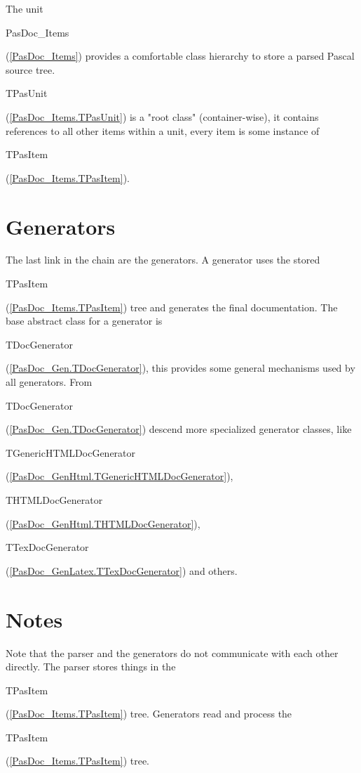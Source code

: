 \documentclass{report}
\begin{document}
The unit \begin{ttfamily}PasDoc{\_}Items\end{ttfamily}(\ref{PasDoc_Items}) provides a comfortable class hierarchy to store a parsed Pascal source tree. \begin{ttfamily}TPasUnit\end{ttfamily}(\ref{PasDoc_Items.TPasUnit}) is a "root class" (container{-}wise), it contains references to all other items within a unit, every item is some instance of \begin{ttfamily}TPasItem\end{ttfamily}(\ref{PasDoc_Items.TPasItem}).

\label{SecGenerators}
\section{Generators}


The last link in the chain are the generators. A generator uses the stored \begin{ttfamily}TPasItem\end{ttfamily}(\ref{PasDoc_Items.TPasItem}) tree and generates the final documentation. The base abstract class for a generator is \begin{ttfamily}TDocGenerator\end{ttfamily}(\ref{PasDoc_Gen.TDocGenerator}), this provides some general mechanisms used by all generators. From \begin{ttfamily}TDocGenerator\end{ttfamily}(\ref{PasDoc_Gen.TDocGenerator}) descend more specialized generator classes, like \begin{ttfamily}TGenericHTMLDocGenerator\end{ttfamily}(\ref{PasDoc_GenHtml.TGenericHTMLDocGenerator}), \begin{ttfamily}THTMLDocGenerator\end{ttfamily}(\ref{PasDoc_GenHtml.THTMLDocGenerator}), \begin{ttfamily}TTexDocGenerator\end{ttfamily}(\ref{PasDoc_GenLatex.TTexDocGenerator}) and others.

\label{SecNotes}
\section{Notes}


Note that the parser and the generators do not communicate with each other directly. The parser stores things in the \begin{ttfamily}TPasItem\end{ttfamily}(\ref{PasDoc_Items.TPasItem}) tree. Generators read and process the \begin{ttfamily}TPasItem\end{ttfamily}(\ref{PasDoc_Items.TPasItem}) tree.
\end{document}
